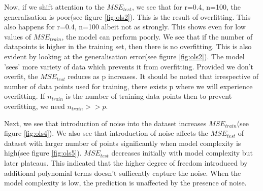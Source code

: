 Now, if we shift attention to the $MSE_{test}$, we see that for r=0.4, n=100, the generalisation is poor(see figure \ref{fig:ols2}). This is the result of overfitting. This also happens for r=0.4, n=100 albeit not as strongly. This shows even for low values of $MSE_{train}$, the model can perform poorly. We see that if the number of datapoints is higher in the training set, then there is no overfitting. This is also evident by looking at the generalisation error(see figure \ref{fig:ols2}). The model 'sees' more variety of data which prevents it from overfitting. Provided we don't overfit, the $MSE_{test}$ reduces as p  increases. It should be noted that irrespective of number of data points used for training, there exists p where we will experience overfitting. If $n_{train}$ is the number of training data points then to prevent overfitting, we need $n_{train} >> p$.

Next, we see that introduction of noise into the dataset increases $MSE_{train}$(see figure \ref{fig:ols4}). We also see that introduction of noise affects the $MSE_{test}$ of dataset with larger number of points significantly when model complexity is high(see figure \ref{fig:ols5}). $MSE_{test}$ decreases initially with model complexity but later plateaus. This indicated that the higher degree of freedom introduced by additional polynomial terms doesn't sufficently capture the noise. When the model complexity is low, the prediction is unaffected by the presence of noise. 

